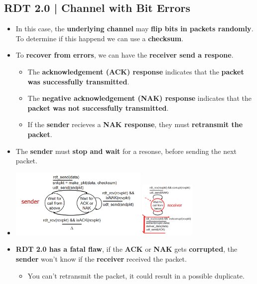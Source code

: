 \documentclass[16pt]{article}
\begin{document}
    \subsection*{RDT 2.0 | Channel with Bit Errors}
    \begin{itemize}
        \item In this case, the \textbf{underlying channel} may \textbf{flip bits in packets randomly}. To determine if this happend we can use a \textbf{checksum}.
        \item To \textbf{recover from errors}, we can have the \textbf{receiver send a respone}.
        \begin{itemize}
            \item The \textbf{acknowledgement (ACK) response} indicates that the \textbf{packet was successfully transmitted}.
            \item The \textbf{negative acknowledgement (NAK) response} indicates that the \textbf{packet was not successfully transmitted}.
            \item If the \textbf{sender} recieves a \textbf{NAK response}, they must \textbf{retransmit the packet}.
        \end{itemize} 
        \item The \textbf{sender} must \textbf{stop and wait} for a resonse, before sending the next packet.
        \item[] \includegraphics*[width=250px]{images/RDT-2.0.PNG} \includegraphics*[width=100px]{images/RDT-2.0-1.PNG}
        \item \textbf{RDT 2.0 has a fatal flaw}, if the \textbf{ACK} or \textbf{NAK} gets \textbf{corrupted}, the \textbf{sender} won't know if the \textbf{receiver} received the packet.
        \begin{itemize}
            \item You can't retransmit the packet, it could result in a possible duplicate.
        \end{itemize} 
    \end{itemize}
\end{document}
